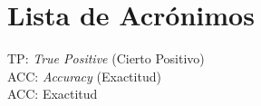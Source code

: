 \thispagestyle{empty}
\section*{Lista de Acrónimos}

TP: \textit{True Positive} (Cierto Positivo) \\
ACC: \textit{Accuracy} (Exactitud) \\
ACC: Exactitud

\clearpage